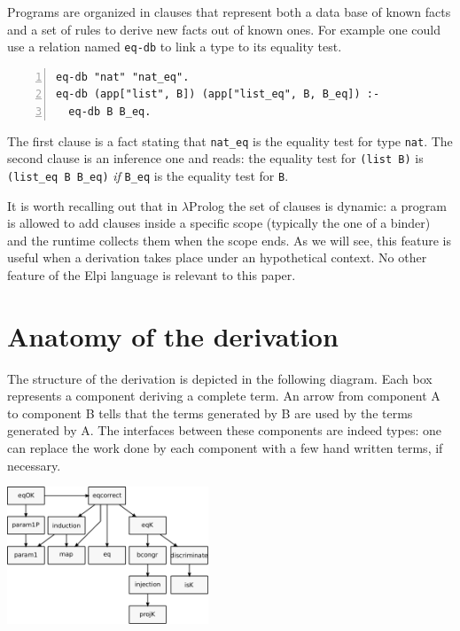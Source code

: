 \documentclass[sigplan,10pt,review]{acmart}\settopmatter{printfolios=true,printccs=false,printacmref=false}
\begin{document}
Programs are
organized in clauses that represent both a data base of known facts
and a set of rules to derive new facts out of known ones.
For example one could use a relation named \lstinline+eq-db+
to link a type to its equality test.

\begin{minipage}{\textwidth}\begin{lstlisting}[numbers=left]
eq-db "nat" "nat_eq".
eq-db (app["list", B]) (app["list_eq", B, B_eq]) :-
  eq-db B B_eq.
\end{lstlisting}\end{minipage}

The first clause is a fact stating that
\lstinline+nat_eq+ is the equality test for type
\lstinline+nat+.
The second clause is an inference one and reads: the equality test
for \lstinline+(list B)+ is \lstinline+(list_eq B B_eq)+ \emph{if}
\lstinline+B_eq+ is the equality test for \lstinline+B+.

It is worth recalling out that in $\lambda$Prolog the set of clauses
is dynamic: a program is allowed to add clauses inside
a specific scope (typically the one of a binder) and the runtime
collects them when the scope ends. As we will see, this feature
is useful when a derivation takes place under an hypothetical
context.
No other feature of the Elpi language is relevant to this paper.

\section{Anatomy of the derivation} %
\label{sec:code}

The structure of the derivation is depicted in the following diagram.
Each box represents a component deriving a complete term.
An arrow from component A to component B tells that the terms
generated by B are used by the terms generated by A. The interfaces
between these components are indeed types: one can replace the work
done by each component with a few hand written terms, if necessary.

\includegraphics[width=0.45\textwidth]{derive.pdf}
\end{document}
